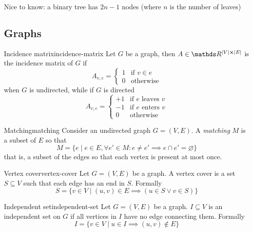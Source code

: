 \documentclass[12pt]{extarticle}
\numberwithin{equation}{subsection}
\begin{document}
Nice to know: a binary tree has $2n -1$ nodes (where $n$ is the number of leaves)

\subsection{Graphs}

\begin{definition}{Incidence matrix}{incidence-matrix}
	Let $G$ be a graph, then $A \in \R^{\abs{V} \cross \abs{E}}$ is the incidence matrix of $G$ if
	\begin{equation}
		A_{v, e} = \begin{cases}
			1 & \text{if } v \in e \\
			0 & \text{otherwise}
		\end{cases}
	\end{equation}
	when $G$ is undirected, while if $G$ is directed
	\begin{equation}
		A_{v, e} = \begin{cases}
			+1 & \text{if $e$ leaves $v$} \\
			-1 & \text{if $e$ enters $v$} \\
			0  & \text{otherwise}
		\end{cases}
	\end{equation}
\end{definition}


\begin{definition}{Matching}{matching}
	Consider an undirected graph $G = (V, E)$.
	A \emph{matching} $M$ is a subset of $E$ so that
	\begin{equation}
		M = \{ e \mid e \in E, \forall e' \in M : e \neq e' \implies e \cap e' = \varnothing \}
	\end{equation}
	that is, a subset of the edges so that each vertex is present at most once.
\end{definition}

\begin{definition}{Vertex cover}{vertex-cover}
	Let $G = (V, E)$ be a graph. A vertex cover is a set $S \subseteq V$ such that each edge has an
	end in $S$. Formally
	\begin{equation}
		S = \{ v \in V \mid (u, v) \in E \implies (u \in S \lor v \in S) \}
	\end{equation}
\end{definition}

\begin{definition}{Independent set}{independent-set}
	Let $G = (V, E)$ be a graph. $I \subseteq V$ is an independent set on $G$ if all vertices in $I$
	have no edge connecting them. Formally
	\begin{equation}
		I = \{ v \in V \mid u \in I \implies (u, v) \notin E \}
	\end{equation}
\end{definition}
\end{document}
